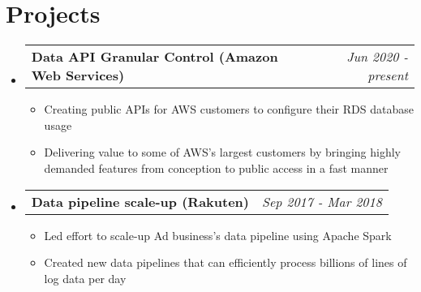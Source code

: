 \documentclass[letterpaper,11pt]{article}
\makeatletter
\newcommand{\bulletItem}[1]{
  \item\small{
    {#1 \vspace{-2pt}}
  }
}
\newcommand{\resumeProject}[2]{
  \vspace{-1pt}\item[]
    \begin{tabular*}{0.97\textwidth}[t]{l@{\extracolsep{\fill}}r}
      \textbf{#1} & \textit{\small #2} \\
    \end{tabular*}\vspace{0pt}
}
\newcommand{\resumeSubHeadingListStart}{\begin{itemize}[leftmargin=0pt]}
\newcommand{\resumeSubHeadingListEnd}{\end{itemize}}
\makeatother
\begin{document}
\section{Projects}

  \resumeSubHeadingListStart
    \resumeProject{Data API Granular Control (Amazon Web Services)}{Jun 2020 - present}
    \begin{itemize} 
      \bulletItem{Creating public APIs for AWS customers to configure their RDS database usage}
      \bulletItem{Delivering value to some of AWS's largest customers by bringing highly demanded features from conception to public access in a fast manner}
    \end{itemize}

  \resumeProject{Data pipeline scale-up (Rakuten)}{Sep 2017 - Mar 2018}
    \begin{itemize} 
      \bulletItem{Led effort to scale-up Ad business's data pipeline using Apache Spark}
      \bulletItem{Created new data pipelines that can efficiently process billions of lines of log data per day}
    \end{itemize}
  \resumeSubHeadingListEnd
\end{document}
